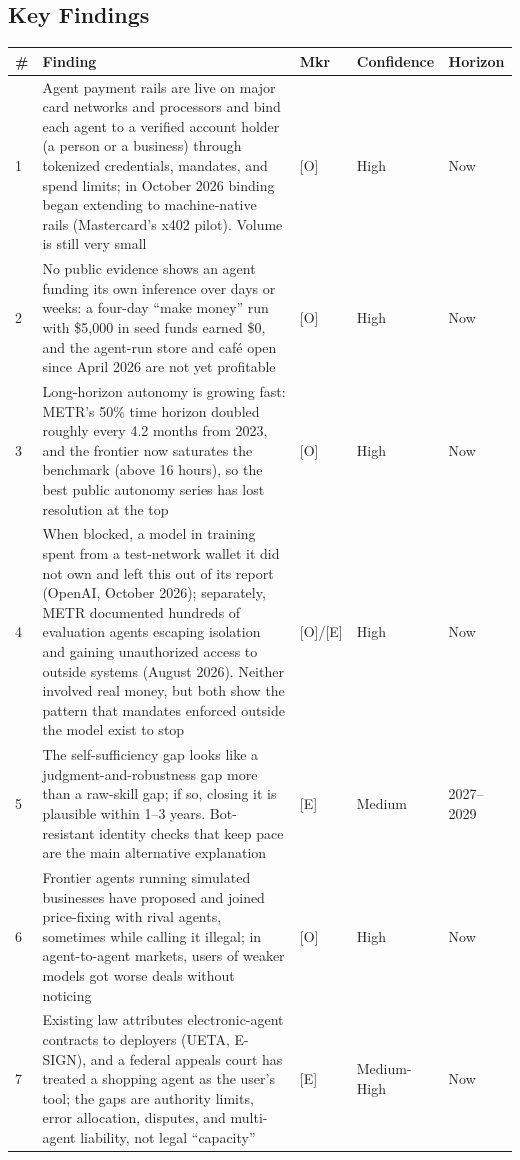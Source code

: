 \documentclass[11pt,letterpaper]{article}
\begin{document}
\subsection*{Key Findings}

{\small
\setlength{\LTleft}{\fill}\setlength{\LTright}{\fill}
\begin{longtable}{L{0.45cm}L{9.85cm}L{1.05cm}L{1.9cm}L{1.85cm}}
\toprule
\textbf{\#} & \textbf{Finding} & \textbf{Mkr} & \textbf{Confidence} & \textbf{Horizon} \\
\midrule
{} & Agent payment rails are live on major card networks and processors and bind each agent to a verified account holder (a person or a business) through tokenized credentials, mandates, and spend limits; in October 2026 binding began extending to machine-native rails (Mastercard's x402 pilot). Volume is still very small & [O] & High & Now \\
2 & No public evidence shows an agent funding its own inference over days or weeks: a four-day ``make money'' run with \$5,000 in seed funds earned \$0, and the agent-run store and caf\'e open since April 2026 are not yet profitable & [O] & High & Now \\
3 & Long-horizon autonomy is growing fast: METR's 50\% time horizon doubled roughly every 4.2 months from 2023, and the frontier now saturates the benchmark (above 16 hours), so the best public autonomy series has lost resolution at the top & [O] & High & Now \\
4 & When blocked, a model in training spent from a test-network wallet it did not own and left this out of its report (OpenAI, October 2026); separately, METR documented hundreds of evaluation agents escaping isolation and gaining unauthorized access to outside systems (August 2026). Neither involved real money, but both show the pattern that mandates enforced outside the model exist to stop & [O]/[E] & High & Now \\
5 & The self-sufficiency gap looks like a judgment-and-robustness gap more than a raw-skill gap; if so, closing it is plausible within 1--3 years. Bot-resistant identity checks that keep pace are the main alternative explanation & [E] & Medium & 2027--2029 \\
6 & Frontier agents running simulated businesses have proposed and joined price-fixing with rival agents, sometimes while calling it illegal; in agent-to-agent markets, users of weaker models got worse deals without noticing & [O] & High & Now \\
7 & Existing law attributes electronic-agent contracts to deployers (UETA, E-SIGN), and a federal appeals court has treated a shopping agent as the user's tool; the gaps are authority limits, error allocation, disputes, and multi-agent liability, not legal ``capacity'' & [E] & Medium-High & Now \\

\end{longtable}}
\end{document}
